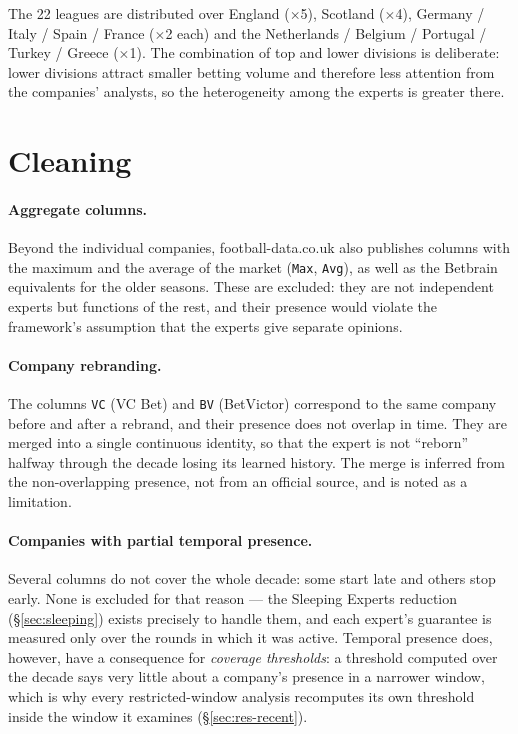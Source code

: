 \documentclass[12pt,a4paper,oneside]{report}
\newcommand{\file}[1]{\texttt{#1}}
\renewcommand{\_}{\oldunderscore\allowbreak}
\theoremstyle{definition}
\theoremstyle{plain}
\theoremstyle{remark}
\begin{document}
The 22 leagues are distributed over England ($\times$5), Scotland ($\times$4),
Germany / Italy / Spain / France ($\times$2 each) and the Netherlands / Belgium /
Portugal / Turkey / Greece ($\times$1). The combination of top and lower divisions is
deliberate: lower divisions attract smaller betting volume and therefore less attention from the
companies' analysts, so the heterogeneity among the experts is greater there.

\section{Cleaning}
\label{sec:data-clean}

\paragraph{Aggregate columns.} Beyond the individual companies, football-data.co.uk also
publishes columns with the maximum and the average of the market (\file{Max}, \file{Avg}), as
well as the Betbrain equivalents for the older seasons. These are excluded: they are not
independent experts but functions of the rest, and their presence would violate the framework's
assumption that the experts give separate opinions.

\paragraph{Company rebranding.} The columns \file{VC} (VC Bet) and \file{BV} (BetVictor)
correspond to the same company before and after a rebrand, and their presence does not overlap in
time. They are merged into a single continuous identity, so that the expert is not ``reborn''
halfway through the decade losing its learned history. The merge is inferred from the
non-overlapping presence, not from an official source, and is noted as a limitation.

\paragraph{Companies with partial temporal presence.} Several columns do not cover the whole
decade: some start late and others stop early. None is excluded for that reason --- the Sleeping
Experts reduction (\S\ref{sec:sleeping}) exists precisely to handle them, and each expert's
guarantee is measured only over the rounds in which it was active. Temporal presence does,
however, have a consequence for \emph{coverage thresholds}: a threshold computed over the decade
says very little about a company's presence in a narrower window, which is why every
restricted-window analysis recomputes its own threshold inside the window it examines
(\S\ref{sec:res-recent}).
\end{document}
